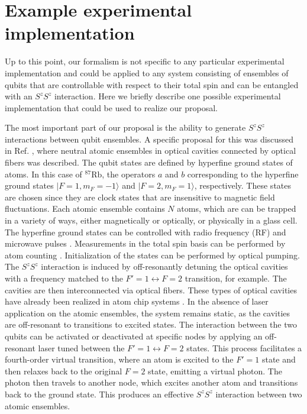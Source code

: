 \documentclass{WileyMSP-template}
\begin{document}
{

\section{Example experimental implementation}

Up to this point, our formalism is not specific to any particular experimental implementation and could be applied to any system consisting of ensembles of qubits that are controllable with respect to their total spin and can be entangled with an $ S^z S^z $ interaction.  Here we briefly describe one possible experimental implementation that could be used to realize our proposal.

The most important part of our proposal is the ability to generate $ S^z S^z $ interactions between qubit ensembles.  A specific proposal for this was discussed in Ref. \cite{pyrkov2013entanglement}, where neutral atomic ensembles in optical cavities connected by optical fibers was described.  The qubit states are defined by hyperfine ground states of atoms.  In this case of $^{87} \text{Rb}$, the operators $a$ and $b$ corresponding to the hyperfine ground states $ |F=1, m_F=-1 \rangle $  and $ | F = 2, m_F = 1 \rangle$, respectively. These states are chosen since they are clock states that are insensitive to magnetic field fluctuations.  Each atomic ensemble contains $ N $ atoms, which are can be trapped in a variety of ways, either magnetically or optically, or physically in a glass cell.  The hyperfine ground states can be controlled with radio frequency (RF) and microwave pulses \cite{bohi2009coherent}.  Measurements in the total spin basis can be performed by atom counting \cite{Hume2013,Ott2016,Qu2020}. Initialization of the states can be performed by optical pumping.  The $S^z S^z $ interaction is induced by off-resonantly detuning the optical cavities with a frequency matched to the $ F' = 1 \leftrightarrow F = 2 $ transition, for example.  The cavities are then interconnected via optical fibers. These types of optical cavities have already been realized in atom chip systems \cite{Colombe2007}.  In the absence of laser application on the atomic ensembles, the system remains static, as the cavities are off-resonant to transitions to excited states. The interaction between the two qubits can be activated or deactivated at specific nodes by applying an off-resonant laser tuned between the $ F' = 1 \leftrightarrow F = 2 $ states. This process facilitates a fourth-order virtual transition, where an atom is excited to the $ F' = 1$ state and then relaxes back to the original $F = 2$ state, emitting a virtual photon.  The photon then travels to another node, which excites another atom and transitions back to the ground state.  This produces an effective $ S^z S^z $ interaction between two atomic ensembles.
}
\end{document}
